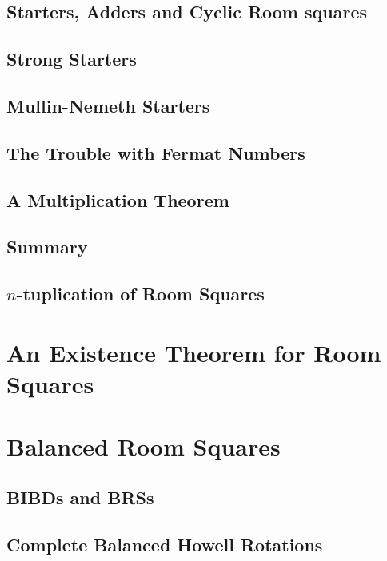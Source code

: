 \documentclass[a4paper, draft]{book}
\begin{document}
\section{Starters, Adders and Cyclic Room squares}
  
\section{Strong Starters}
  \label{sec:strong-starters}
  
\section{Mullin-Nemeth Starters}
  \label{sec:mullin-nemeth}
  
\section{The Trouble with Fermat Numbers}
  \label{sec:trouble-fermat}
  
\section{A Multiplication Theorem}
  
\section{Summary}
  
\section{$n$-tuplication of Room Squares}
  

\chapter{An Existence Theorem for Room Squares}
  \label{ch:existence-theorem}
  

\chapter{Balanced Room Squares}
  \label{ch:balanced-room-squares}

\section{BIBDs and BRSs}
  
\section{Complete Balanced Howell Rotations}
  
\end{document}
